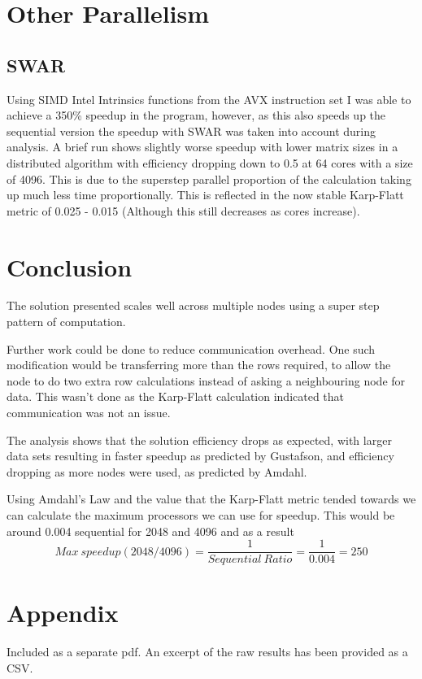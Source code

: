 \documentclass[a4paper,10pt]{report}
\begin{document}
\section{Other Parallelism}
\subsection{SWAR}
Using SIMD Intel Intrinsics functions from the AVX instruction set I was able to achieve a 350\% speedup in the program, however, as this also speeds up the sequential version the speedup with SWAR was taken into account during analysis. A brief run shows slightly worse speedup with lower matrix sizes in a distributed algorithm with efficiency dropping down to 0.5 at 64 cores with a size of 4096. This is due to the superstep parallel proportion of the calculation taking up much less time proportionally. This is reflected in the now stable Karp-Flatt metric of 0.025 - 0.015 (Although this still decreases as cores increase).

\section{Conclusion}
The solution presented scales well across multiple nodes using a super step pattern of computation.

Further work could be done to reduce communication overhead. One such modification would be transferring more than the rows required, to allow the node to do two extra row calculations instead of asking a neighbouring node for data. This wasn't done as the Karp-Flatt calculation indicated that communication was not an issue.

The analysis shows that the solution efficiency drops as expected, with larger data sets resulting in faster speedup as predicted by Gustafson, and efficiency dropping as more nodes were used, as predicted by Amdahl.

Using Amdahl's Law and the value that the Karp-Flatt metric tended towards we can calculate the maximum processors we can use for speedup. This would be around 0.004 sequential for 2048 and 4096 and as a result $$Max\ speedup(2048/4096) = \frac{1}{Sequential\ Ratio} = \frac{1}{0.004} = 250$$

\section{Appendix}

Included as a separate pdf. An excerpt of the raw results has been provided as a CSV.
\end{document}
